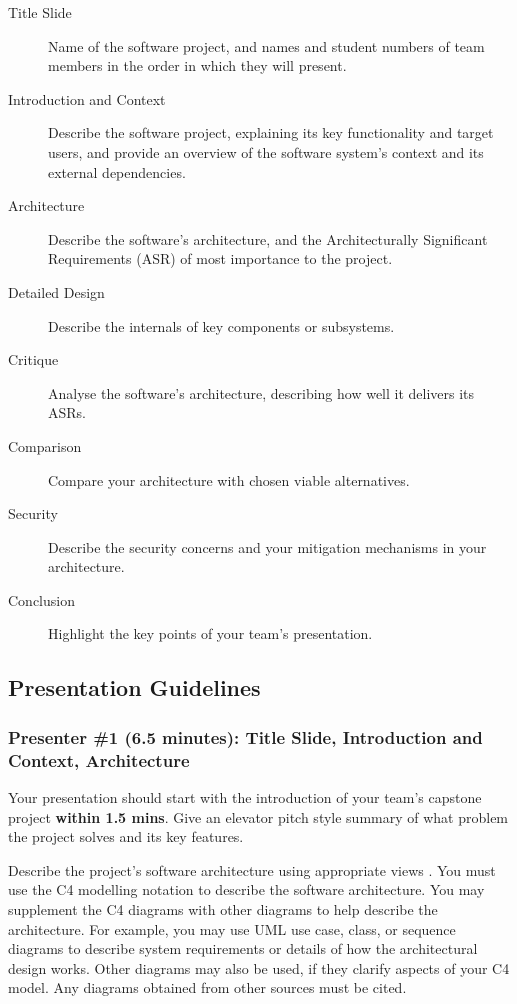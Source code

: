 \documentclass{csse4400}
\begin{document}
\begin{description}
    \item[Title Slide] Name of the software project, and names and student numbers of team members in the order in which they will present.
    \item[Introduction and Context] Describe the software project, explaining its key functionality and target users, and provide an overview of the software system's context and its external dependencies.
    \item[Architecture] Describe the software's architecture, and the Architecturally Significant Requirements (ASR) of most importance to the project.
    \item[Detailed Design] Describe the internals of key components or subsystems.
    \item[Critique] Analyse the software's architecture, describing how well it delivers its ASRs.
    \item[Comparison] Compare your architecture with chosen viable alternatives.
    \item[Security] Describe the security concerns and your mitigation mechanisms in your architecture.
    \item[Conclusion] Highlight the key points of your team's presentation.
\end{description}

\subsection{Presentation Guidelines}

\subsubsection{Presenter \#1 (6.5 minutes): Title Slide, Introduction and Context, Architecture}

Your presentation should start with the introduction of your team's capstone project \textbf{within 1.5 mins}.
Give an elevator pitch style summary of what problem the project solves and its key features.


Describe the project's software architecture using appropriate views \cite{view-notes}.
You must use the C4 modelling notation \cite{view-notes} \cite{brown2022c4} to describe the software architecture.
You may supplement the C4 diagrams with other diagrams to help describe the architecture.
For example, you may use UML use case, class, or sequence diagrams \cite{view-notes} \cite{uml}
to describe system requirements or details of how the architectural design works.
Other diagrams may also be used, if they clarify aspects of your C4 model.
Any diagrams obtained from other sources  must be cited.
\end{document}
